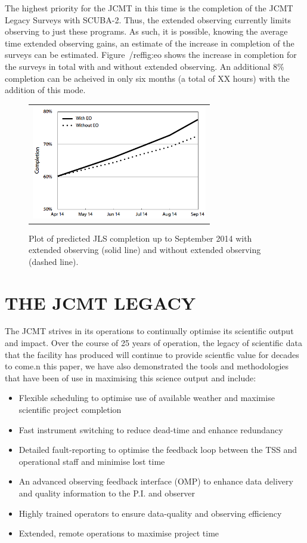 \documentclass[]{spie}  %
\begin{document}
The highest priority for the JCMT in this time is the completion of
the JCMT Legacy Surveys with SCUBA-2. Thus, the extended observing
currently limits observing to just these programs. As such, it is
possible, knowing the average time extended observing gains, an
estimate of the increase in completion of the surveys can be
estimated. Figure~/ref{fig:eo} shows the increase in completion for
the surveys in total with and without extended observing. An
additional 8$\%$ completion can be acheived in only six months (a
total of XX hours) with the addition of this mode.

\begin{figure}[ht]
   \begin{center}
   \begin{tabular}{c}
   \includegraphics[height=5cm]{JLScompletion-SPIE.png}
   \end{tabular}
   \end{center}
   \caption{\label{fig:eo} Plot of predicted JLS completion up to September 2014 with extended observing (solid line) and without extended observing (dashed line).}
\end{figure}


\section{THE JCMT LEGACY}

The JCMT strives in its operations to continually optimise its
scientific output and impact. Over the course of 25 years of
operation, the legacy of scientific data that the facility has
produced will continue to provide scientfic value for decades to
come.n this paper, we have also demonstrated the tools and
methodologies that have been of use in maximising this science output
and include:
\begin{itemize}
\item Flexible scheduling to optimise use of available weather and
  maximise scientific project completion
\item Fast instrument switching to reduce dead-time and enhance
  redundancy
\item Detailed fault-reporting to optimise the feedback loop between
  the TSS and operational staff and minimise lost time
\item An advanced observing feedback interface (OMP) to enhance data
  delivery and quality information to the P.I. and observer
\item Highly trained operators to ensure data-quality and observing
  efficiency
\item Extended, remote operations to maximise project time
\end{itemize}
\end{document}
